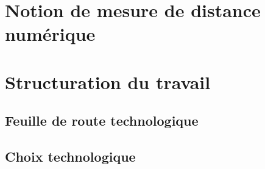 \section{Notion de mesure de distance numérique}





\section{Structuration du travail} 

\subsection{Feuille de route technologique}

\subsection{Choix technologique}














































 
